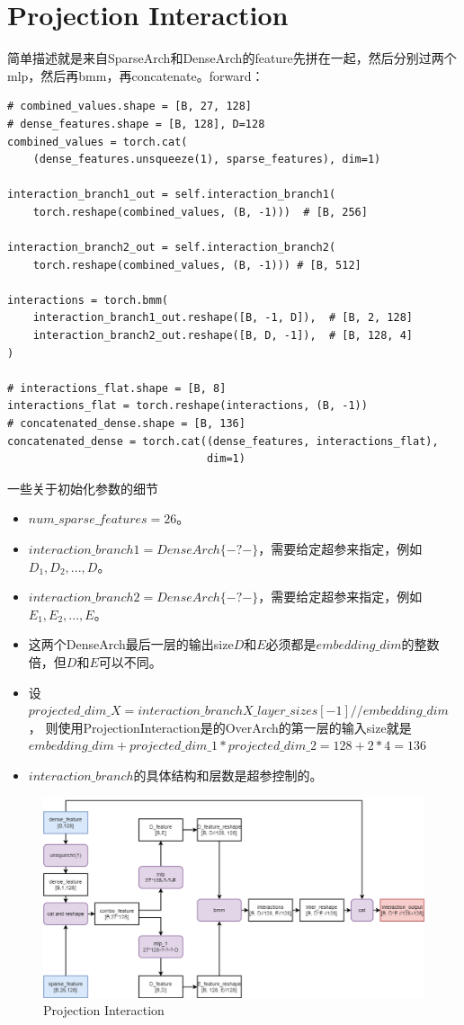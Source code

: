 \documentclass{article}
\begin{document}
\section{Projection Interaction}
简单描述就是来自SparseArch和DenseArch的feature先拼在一起，然后分别过两个mlp，然后再bmm，再concatenate。forward：
\lstset{language=Python}
\begin{lstlisting}
# combined_values.shape = [B, 27, 128]
# dense_features.shape = [B, 128], D=128
combined_values = torch.cat(
    (dense_features.unsqueeze(1), sparse_features), dim=1)

interaction_branch1_out = self.interaction_branch1(
    torch.reshape(combined_values, (B, -1)))  # [B, 256]

interaction_branch2_out = self.interaction_branch2(
    torch.reshape(combined_values, (B, -1))) # [B, 512]

interactions = torch.bmm(
    interaction_branch1_out.reshape([B, -1, D]),  # [B, 2, 128]
    interaction_branch2_out.reshape([B, D, -1]),  # [B, 128, 4]
) 

# interactions_flat.shape = [B, 8]
interactions_flat = torch.reshape(interactions, (B, -1))  
# concatenated_dense.shape = [B, 136]
concatenated_dense = torch.cat((dense_features, interactions_flat), 
                               dim=1)
\end{lstlisting}
一些关于初始化参数的细节
\begin{itemize}
    \item $num\_sparse\_features = 26$。
    \item $interaction\_branch1=DenseArch\{ - ? -\}$，需要给定超参来指定，例如$D_1,D_2,...,D$。
    \item $interaction\_branch2=DenseArch\{ - ? -\}$，需要给定超参来指定，例如$E_1,E_2,...,E$。
    \item 这两个DenseArch最后一层的输出size$D$和$E$必须都是$embedding\_dim$的整数倍，但$D$和$E$可以不同。
    \item 设$projected\_dim\_X = interaction\_branchX\_layer\_sizes[-1] // embedding\_dim$，
    则使用ProjectionInteraction是的OverArch的第一层的输入size就是$embedding\_dim + projected\_dim\_1 * projected\_dim\_2 = 128+ 2*4 = 136$
    \item $interaction\_branch$的具体结构和层数是超参控制的。
\end{itemize}

\begin{figure}[H]
    \centering
    \includegraphics[scale=0.4]{dlrm2_projection.png}
    \caption{Projection Interaction}
\end{figure}
\end{document}
